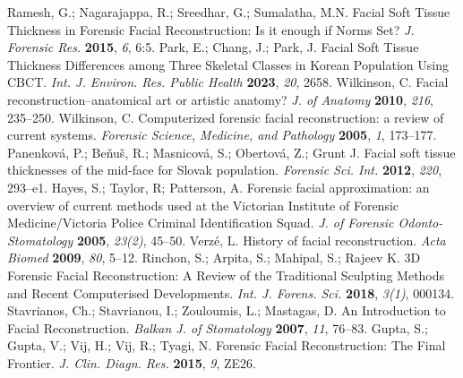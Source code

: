 \documentclass[journal,article,submit,pdftex,moreauthors]{Definitions/mdpi}
\begin{document}
%

\begin{thebibliography}{999}
Ramesh, G.; Nagarajappa, R.; Sreedhar, G.; Sumalatha, M.N. Facial Soft Tissue Thickness in Forensic Facial Reconstruction: Is it enough if Norms Set? {\em J. Forensic Res.} {\bf 2015}, {\em 6}, 6:5.
Park, E.; Chang, J.; Park, J. Facial Soft Tissue Thickness Differences among Three Skeletal Classes in Korean Population Using CBCT. {\em Int. J. Environ. Res. Public Health} {\bf 2023}, {\em 20}, 2658.
Wilkinson, C. Facial reconstruction--anatomical art or artistic anatomy? {\em J. of Anatomy} {\bf 2010}, {\em 216}, 235--250.
Wilkinson, C. Computerized forensic facial reconstruction: a review of current systems. {\em Forensic Science, Medicine, and Pathology} {\bf 2005}, {\em 1}, 173--177.
Panenkov{\'a}, P.; Be{\v{n}}u{\v{s}}, R.; Masnicov{\'a}, S.; Obertov{\'a}, Z.; Grunt J. Facial soft tissue thicknesses of the mid-face for Slovak population. {\em Forensic Sci. Int.} {\bf 2012}, {\em 220}, 293--e1.
Hayes, S.; Taylor, R; Patterson, A. Forensic facial approximation: an overview of current methods used at the Victorian Institute of Forensic Medicine/Victoria Police Criminal Identification Squad. {\em J. of Forensic Odonto-Stomatology} {\bf 2005}, {\em 23(2)}, 45--50.
Verz{\'e}, L. History of facial reconstruction. {\em Acta Biomed} {\bf 2009}, {\em 80}, 5--12.
Rinchon, S.; Arpita, S.; Mahipal, S.; Rajeev K. 3D Forensic Facial Reconstruction: A Review of the Traditional Sculpting Methods and Recent Computerised Developments. {\em Int. J. Forens. Sci.} {\bf 2018}, {\em 3(1)}, 000134.
Stavrianos, Ch.; Stavrianou, I.; Zouloumis, L.; Mastagas, D. An Introduction to Facial Reconstruction. {\em Balkan J. of Stomatology} {\bf 2007}, {\em 11}, 76--83.
Gupta, S.; Gupta, V.; Vij, H.; Vij, R.; Tyagi, N. Forensic Facial Reconstruction: The Final Frontier. {\em J. Clin. Diagn. Res.} {\bf 2015}, {\em 9}, ZE26.

\end{thebibliography}
\end{document}
